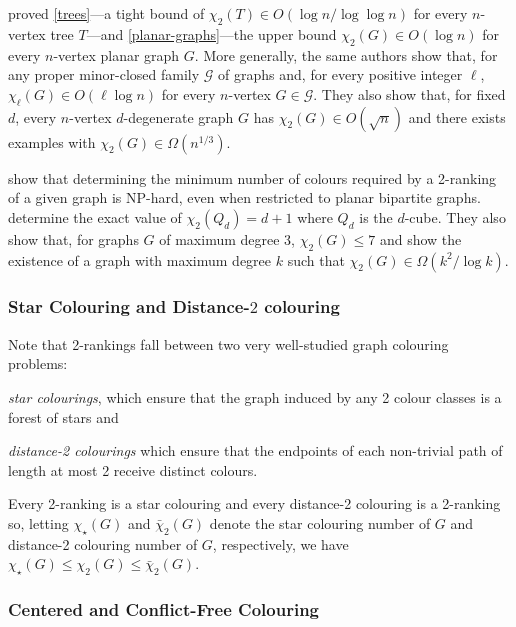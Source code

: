 \documentclass[kpfonts]{patmorin}
\newcommand{\trn}{\chi_2}
\newcommand{\lrn}{\chi_{\ell}}
\newcommand{\dtcn}{\bar{\chi}_2}
\newcommand{\scn}{\chi_{\star}}
\theoremstyle{named}
\begin{document}
\citet{karpas.neiman.ea:on} proved \cref{trees}---a tight bound of $\trn(T)\in O(\log n/\log\log n)$ for every $n$-vertex tree $T$---and \cref{planar-graphs}---the upper bound $\trn(G)\in O(\log n)$ for every $n$-vertex planar graph $G$.  More generally, the same authors show that, for any proper minor-closed family $\mathcal{G}$ of graphs and, for every positive integer $\ell$, $\lrn(G)\in O(\ell\log n)$ for every $n$-vertex $G\in\mathcal{G}$.  They also show that, for fixed $d$, every $n$-vertex $d$-degenerate graph $G$ has $\trn(G)\in O(\sqrt{n})$ and there exists examples with $\trn(G)\in\Omega(n^{1/3})$.

\citet{shalu.antony:complexity} show that determining the minimum number of colours required by a 2-ranking of a given graph is NP-hard, even when restricted to planar bipartite graphs.  \citet{almeter.demircan.ea:graph} determine the exact value of $\trn(Q_d)=d+1$ where $Q_d$ is the $d$-cube.  They also show that, for graphs $G$ of maximum degree 3, $\trn(G)\le 7$ and show the existence of a graph with maximum degree $k$ such that $\trn(G)\in\Omega(k^2/\log k)$.


\subsubsection{Star Colouring and Distance-$2$ colouring}

 Note that 2-rankings fall between two very well-studied graph colouring problems:
\begin{compactitem}
    \item \emph{star colourings}, which ensure that the graph induced by any 2 colour classes is a forest of stars and
    \item \emph{distance-2 colourings} which ensure that the endpoints of each non-trivial path of length at most 2 receive distinct colours.
\end{compactitem}
Every 2-ranking is a star colouring and every distance-2 colouring is a 2-ranking so, letting $\scn(G)$ and $\dtcn(G)$ denote the star colouring number of $G$ and distance-2 colouring number of $G$, respectively, we have $\scn(G) \le \trn(G)\le \dtcn(G)$.


\subsubsection{Centered and Conflict-Free Colouring}

\end{document}
